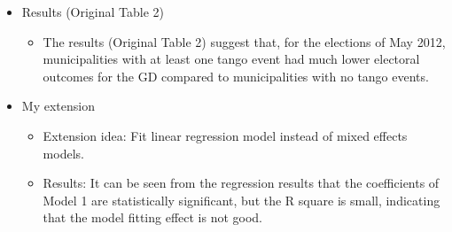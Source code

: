 \documentclass[12pt,letterpaper]{article}
\begin{document}
\begin{itemize}
\begin{itemize}
	\end{itemize}
	\item
	Results  (Original Table 2)
	\begin{itemize}
		\item 
		The results  (Original Table 2) suggest that, for the elections of May 2012, municipalities with at least one tango event had much lower electoral outcomes for the GD compared to municipalities with no tango events.
	\end{itemize}
	\item
	My extension
	\begin{itemize}
		\item
		Extension idea: Fit linear regression model instead of mixed effects models.
	\end{itemize}
	
	\begin{itemize}
		\item Results: It can be seen from the regression results that the coefficients of Model 1  are statistically significant, but the R square is small, indicating that the model fitting effect is not good.
	\end{itemize}
	
\end{itemize}     
\end{document}
